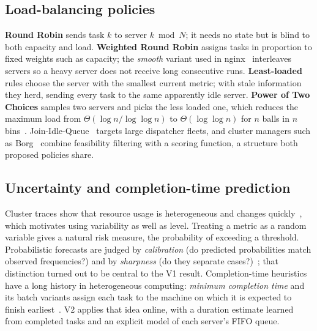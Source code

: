\documentclass[11pt,a4paper]{article}
\begin{document}
\subsection{Load-balancing policies}
\textbf{Round Robin} sends task $k$ to server $k \bmod N$; it needs no state but is blind to both capacity
and load. \textbf{Weighted Round Robin} assigns tasks in proportion to fixed weights such as capacity; the
\emph{smooth} variant used in nginx~\cite{nginx} interleaves servers so a heavy server does not receive long
consecutive runs. \textbf{Least-loaded} rules choose the server with the smallest current metric; with
stale information they herd, sending every task to the same apparently idle server. \textbf{Power of Two
Choices} samples two servers and picks the less loaded one, which reduces the maximum load from
$\Theta(\log n/\log\log n)$ to $\Theta(\log\log n)$ for $n$ balls in $n$ bins~\cite{azar1999,mitzenmacher2001}.
Join-Idle-Queue~\cite{lu2011} targets large dispatcher fleets, and cluster managers such as
Borg~\cite{verma2015} combine feasibility filtering with a scoring function, a structure both proposed
policies share.

\subsection{Uncertainty and completion-time prediction}
Cluster traces show that resource usage is heterogeneous and changes quickly~\cite{reiss2012,tirmazi2020},
which motivates using variability as well as level. Treating a metric as a random variable gives a natural
risk measure, the probability of exceeding a threshold. Probabilistic forecasts are judged by
\emph{calibration} (do predicted probabilities match observed frequencies?) and by
\emph{sharpness} (do they separate cases?)~\cite{gneiting2007}; that distinction turned out to be central to
the V1 result. Completion-time heuristics have a long history in heterogeneous computing:
\emph{minimum completion time} and its batch variants assign each task to the machine on which it is
expected to finish earliest~\cite{braun2001}. V2 applies that idea online, with a duration estimate learned
from completed tasks and an explicit model of each server's FIFO queue.
\end{document}
